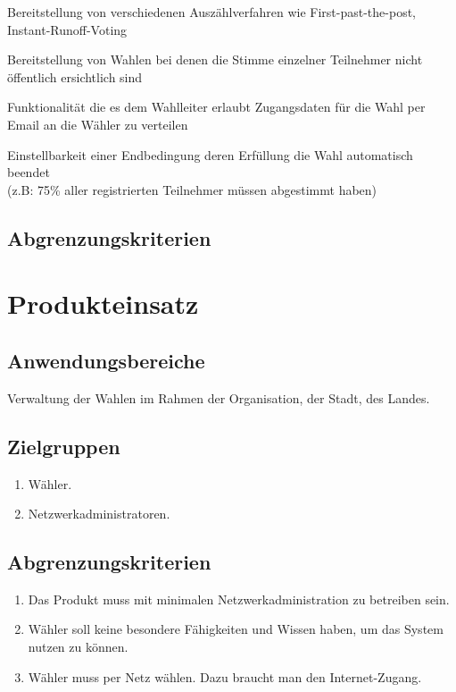 \documentclass[parskip=full,11pt,twoside]{scrartcl}
\begin{document}
Bereitstellung von verschiedenen Auszählverfahren wie First-past-the-post, Instant-Runoff-Voting

Bereitstellung von Wahlen bei denen die Stimme einzelner Teilnehmer nicht öffentlich ersichtlich sind

Funktionalität die es dem Wahlleiter erlaubt Zugangsdaten für die Wahl per Email an die Wähler zu verteilen

Einstellbarkeit einer Endbedingung deren Erfüllung die Wahl automatisch beendet \\(z.B: 75\% aller registrierten Teilnehmer müssen abgestimmt haben)

\subsection{Abgrenzungskriterien}

\section{Produkteinsatz}

\subsection{Anwendungsbereiche}
Verwaltung der Wahlen im Rahmen der Organisation, der Stadt, des Landes.

\subsection{Zielgruppen}
\begin{enumerate}
  \item Wähler.
  \item Netzwerkadministratoren.
\end{enumerate}

\subsection{Abgrenzungskriterien}
\begin{enumerate}
  \item Das Produkt muss mit minimalen Netzwerkadministration zu betreiben sein.
  \item Wähler soll keine besondere Fähigkeiten und Wissen  haben, um das System nutzen zu können.
  \item Wähler muss per Netz wählen. Dazu braucht man den Internet-Zugang.
\end{enumerate}
\end{document}
